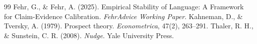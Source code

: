 \documentclass[11pt,a4paper]{article}
\theoremstyle{remark}
\begin{document}
\newpage

\begin{thebibliography}{99}
 Fehr, G., \& Fehr, A. (2025). Empirical Stability of Language: A Framework for Claim-Evidence Calibration. \textit{FehrAdvice Working Paper}.
 Kahneman, D., \& Tversky, A. (1979). Prospect theory. \textit{Econometrica}, 47(2), 263--291.
 Thaler, R. H., \& Sunstein, C. R. (2008). \textit{Nudge}. Yale University Press.
\end{thebibliography}
\end{document}
